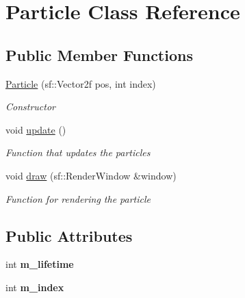 \hypertarget{class_particle}{}\section{Particle Class Reference}
\label{class_particle}
\subsection*{Public Member Functions}
\begin{DoxyCompactItemize}
\item 
\mbox{\hyperlink{class_particle_a33755d4e470cf8e91f7aa224d48effb4}{Particle}} (sf\+::\+Vector2f pos, int index)
\begin{DoxyCompactList}\small\item\em Constructor \end{DoxyCompactList}\item 
void \mbox{\hyperlink{class_particle_a686aad22bf7a80a089e117bbc7f4b738}{update}} ()
\begin{DoxyCompactList}\small\item\em Function that updates the particles \end{DoxyCompactList}\item 
void \mbox{\hyperlink{class_particle_a7f81b3af6985c5e96e77422dc80e732a}{draw}} (sf\+::\+Render\+Window \&window)
\begin{DoxyCompactList}\small\item\em Function for rendering the particle \end{DoxyCompactList}\end{DoxyCompactItemize}
\subsection*{Public Attributes}
\begin{DoxyCompactItemize}
\item 
\mbox{\label{class_particle_a4512e3faa60d861934b534a4deee6b17}} 
int {\bfseries m\+\_\+lifetime}
\item 
\mbox{\label{class_particle_a38f9993ef8ef797fcaae535ff5317334}} 
int {\bfseries m\+\_\+index}
\end{DoxyCompactItemize}
